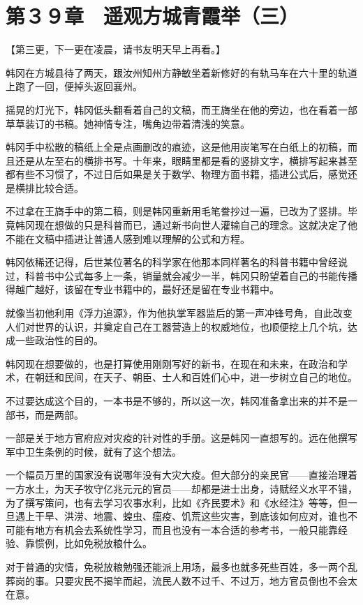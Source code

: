 \section{第３９章　遥观方城青霞举（三）}

【第三更，下一更在凌晨，请书友明天早上再看。】

韩冈在方城县待了两天，跟汝州知州方静敏坐着新修好的有轨马车在六十里的轨道上跑了一回，便掉头返回襄州。

摇晃的灯光下，韩冈低头翻看着自己的文稿，而王旖坐在他的旁边，也在看着一部草草装订的书稿。她神情专注，嘴角边带着清浅的笑意。

韩冈手中松散的稿纸上全是点画删改的痕迹，这是他用炭笔写在白纸上的初稿，而且还是从左至右的横排书写。十年来，眼睛里都是看的竖排文字，横排写起来甚至都有些不习惯了，不过日后如果是关于数学、物理方面书籍，插进公式后，感觉还是横排比较合适。

不过拿在王旖手中的第二稿，则是韩冈重新用毛笔誊抄过一遍，已改为了竖排。毕竟韩冈现在想做的只是科普而已，通过新书向世人灌输自己的理念。这就决定了他不能在文稿中插进让普通人感到难以理解的公式和方程。

韩冈依稀还记得，后世某位著名的科学家在他那本同样著名的科普书籍中曾经说过，科普书中公式每多上一条，销量就会减少一半，韩冈只盼望着自己的书能传播得越广越好，该留在专业书籍中的，最好还是留在专业书籍中。

就像当初他利用《浮力追源》，作为他执掌军器监后的第一声冲锋号角，自此改变人们对世界的认识，并奠定自己在工器营造上的权威地位，也顺便挖上几个坑，达成一些政治性的目的。

韩冈现在想要做的，也是打算使用刚刚写好的新书，在现在和未来，在政治和学术，在朝廷和民间，在天子、朝臣、士人和百姓们心中，进一步树立自己的地位。

不过要达成这个目的，一本书是不够的，所以这一次，韩冈准备拿出来的并不是一部书，而是两部。

一部是关于地方官府应对灾疫的针对性的手册。这是韩冈一直想写的。远在他撰写军中卫生条例的时候，就有了这个想法。

一个幅员万里的国家没有说哪年没有大灾大疫。但大部分的亲民官——直接治理着一方水土，为天子牧守亿兆元元的官员——却都是进士出身，诗赋经义水平不错，为了撰写策问，也有去学习农事水利，比如《齐民要术》和《水经注》等等，但一旦遇上干旱、洪涝、地震、蝗虫、瘟疫、饥荒这些灾害，到底该如何应对，谁也不可能有地方有机会去系统性学习，而且也没有一本合适的参考书，一般只能靠经验、靠惯例，比如免税放粮什么。

对于普通的灾情，免税放粮勉强还能派上用场，最多也就多死些百姓，多一两个乱葬岗的事。只要灾民不揭竿而起，流民人数不过千、不过万，地方官员倒也不会太在意。

